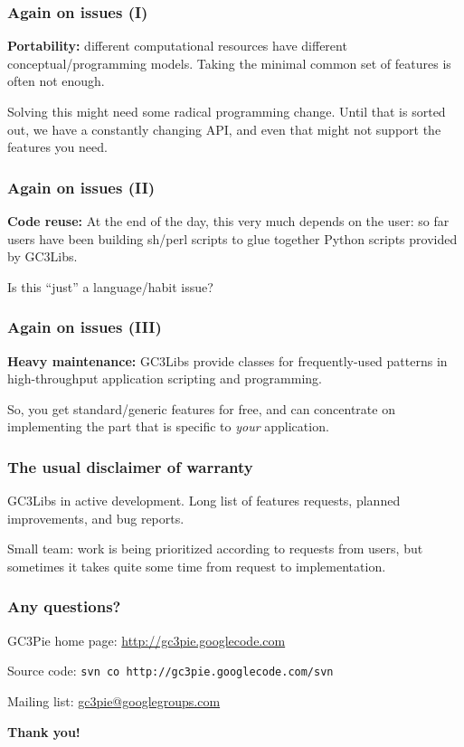 \documentclass[presentation]{beamer}
\begin{document}
\begin{frame}
\frametitle{Again on issues (I)}
\label{sec-34}

  \textbf{Portability:} different computational resources have different
  conceptual/programming models.  Taking the minimal common set of
  features is often not enough. 

  Solving this might need some radical programming change.
  Until that is sorted out, we have a constantly changing API, and
  even that might not support the features you need.
\end{frame}
\begin{frame}
\frametitle{Again on issues (II)}
\label{sec-35}

  \textbf{Code reuse:} At the end of the day, this very much depends on the
  user: so far users have been building sh/perl scripts to glue
  together Python scripts provided by GC3Libs.

  Is this ``just'' a language/habit issue?
\end{frame}
\begin{frame}
\frametitle{Again on issues (III)}
\label{sec-36}

  \textbf{Heavy maintenance:} GC3Libs provide classes for frequently-used
   patterns in high-throughput application scripting and programming.

   So, you get standard/generic features for free, and can concentrate
   on implementing the part that is specific to \emph{your} application.
\end{frame}
\begin{frame}
\frametitle{The usual disclaimer of warranty}
\label{sec-37}


  GC3Libs in active development.  Long list of features requests,
  planned improvements, and bug reports.

  Small team: work is being prioritized according to requests from
  users, but sometimes it takes quite some time from request to
  implementation.
  
\end{frame}
\begin{frame}
\frametitle{Any questions?}
\label{sec-38}

\begin{center}
GC3Pie home page: \href{http://gc3pie.googlecode.com}{http://gc3pie.googlecode.com}

Source code: \texttt{svn co http://gc3pie.googlecode.com/svn}

Mailing list: \href{mailto:gc3pie@googlegroups.com}{gc3pie@googlegroups.com}

\textbf{Thank you!}
\end{center}
\end{frame}
\end{document}
